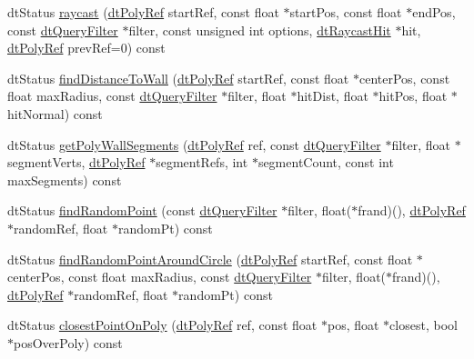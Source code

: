 \begin{Indent}
\begin{DoxyCompactItemize}
\item 
dt\+Status \hyperlink{classdtNavMeshQuery_a96bd4282df1e863d1c813b2fe881a262}{raycast} (\hyperlink{group__detour_gab4e0b2257a670c1a800057999612b466}{dt\+Poly\+Ref} start\+Ref, const float $\ast$start\+Pos, const float $\ast$end\+Pos, const \hyperlink{classdtQueryFilter}{dt\+Query\+Filter} $\ast$filter, const unsigned int options, \hyperlink{structdtRaycastHit}{dt\+Raycast\+Hit} $\ast$hit, \hyperlink{group__detour_gab4e0b2257a670c1a800057999612b466}{dt\+Poly\+Ref} prev\+Ref=0) const
\item 
dt\+Status \hyperlink{classdtNavMeshQuery_a1576a980ae29e44ad4809a25974fbd40}{find\+Distance\+To\+Wall} (\hyperlink{group__detour_gab4e0b2257a670c1a800057999612b466}{dt\+Poly\+Ref} start\+Ref, const float $\ast$center\+Pos, const float max\+Radius, const \hyperlink{classdtQueryFilter}{dt\+Query\+Filter} $\ast$filter, float $\ast$hit\+Dist, float $\ast$hit\+Pos, float $\ast$hit\+Normal) const
\item 
dt\+Status \hyperlink{classdtNavMeshQuery_a2c49662f07e52f1488622089952a154c}{get\+Poly\+Wall\+Segments} (\hyperlink{group__detour_gab4e0b2257a670c1a800057999612b466}{dt\+Poly\+Ref} ref, const \hyperlink{classdtQueryFilter}{dt\+Query\+Filter} $\ast$filter, float $\ast$segment\+Verts, \hyperlink{group__detour_gab4e0b2257a670c1a800057999612b466}{dt\+Poly\+Ref} $\ast$segment\+Refs, int $\ast$segment\+Count, const int max\+Segments) const
\item 
dt\+Status \hyperlink{classdtNavMeshQuery_af86c392a14bd788b0caecf21d9fb4b3d}{find\+Random\+Point} (const \hyperlink{classdtQueryFilter}{dt\+Query\+Filter} $\ast$filter, float($\ast$frand)(), \hyperlink{group__detour_gab4e0b2257a670c1a800057999612b466}{dt\+Poly\+Ref} $\ast$random\+Ref, float $\ast$random\+Pt) const
\item 
dt\+Status \hyperlink{classdtNavMeshQuery_abfb87531eb962cbd51c649469de2e4fa}{find\+Random\+Point\+Around\+Circle} (\hyperlink{group__detour_gab4e0b2257a670c1a800057999612b466}{dt\+Poly\+Ref} start\+Ref, const float $\ast$center\+Pos, const float max\+Radius, const \hyperlink{classdtQueryFilter}{dt\+Query\+Filter} $\ast$filter, float($\ast$frand)(), \hyperlink{group__detour_gab4e0b2257a670c1a800057999612b466}{dt\+Poly\+Ref} $\ast$random\+Ref, float $\ast$random\+Pt) const
\item 
dt\+Status \hyperlink{classdtNavMeshQuery_a07a90efe5d1a2b4b530aa236370574d9}{closest\+Point\+On\+Poly} (\hyperlink{group__detour_gab4e0b2257a670c1a800057999612b466}{dt\+Poly\+Ref} ref, const float $\ast$pos, float $\ast$closest, bool $\ast$pos\+Over\+Poly) const

\end{DoxyCompactItemize}
\end{Indent}
